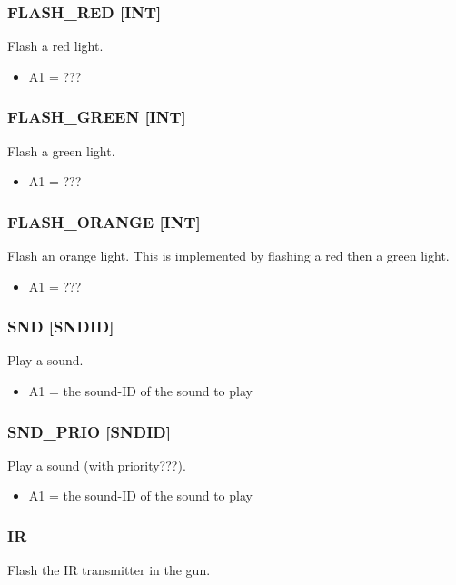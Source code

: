 \documentclass[12pt,a4paper]{scrbook}
\begin{document}
\subsubsection{FLASH\_RED [INT]}
Flash a red light.

\begin{itemize}
\item A1 = ???
\end{itemize}
\subsubsection{FLASH\_GREEN [INT]}
Flash a green light.

\begin{itemize}
\item A1 = ???
\end{itemize}

\subsubsection{FLASH\_ORANGE [INT]}
Flash an orange light.  This is implemented by flashing a red then a green light.

\begin{itemize}
\item A1 = ???
\end{itemize}

\subsubsection{SND [SNDID]}
Play a sound.
\begin{itemize}
\item A1 = the sound-ID of the sound to play 
\end{itemize}

\subsubsection{SND\_PRIO [SNDID]}
Play a sound (with priority???).
\begin{itemize}
\item A1 = the sound-ID of the sound to play
\end{itemize}

\subsubsection{IR}
Flash the IR transmitter in the gun.

\end{document}
